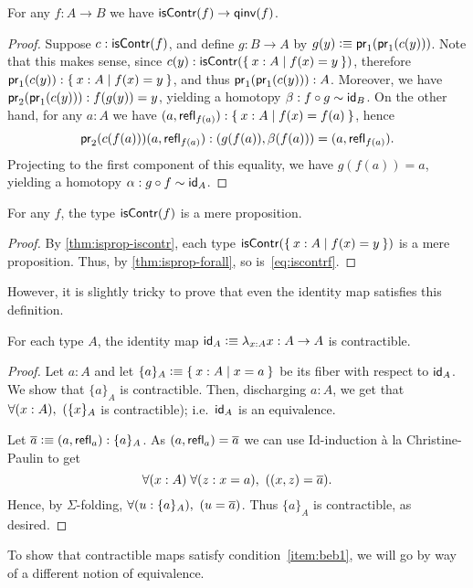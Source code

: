 \begin{lem}
  For any $f:A\to B$ we have $\iscontr(f)\to\qinv(f)$.
\end{lem}
\begin{proof}
  Suppose $c:\iscontr(f)$, and define $g:B\to A$ by $g(y)\defeq \proj1(\proj1(c(y)))$.
  Note that this makes sense, since $c(y):\iscontr (\setof{x:A | f(x) = y})$, therefore $\proj1(c(y)):\setof{x:A | f(x) = y}$, and thus $\proj1(\proj1(c(y))) : A$.
  Moreover, we have $\proj2(\proj1(c(y))) : f(g(y))=y$, yielding a homotopy $\beta:f\circ g\htpy \idfunc[B]$.
  On the other hand, for any $a:A$ we have $(a,\refl{f(a)}) : \setof{x:A | f(x) = f(a)}$, hence
  \[\proj2(c(f(a)))(a,\refl{f(a)}) : (g(f(a)),\beta(f(a))) = (a,\refl{f(a)}).\]
  Projecting to the first component of this equality, we have $g(f(a))=a$, yielding a homotopy $\alpha:g\circ f \htpy \idfunc[A]$.
\end{proof}

\begin{lem}
  For any $f$, the type $\iscontr(f)$ is a mere proposition.
\end{lem}
\begin{proof}
  By \autoref{thm:isprop-iscontr}, each type $\iscontr (\setof{x:A | f(x) = y})$ is a mere proposition.
  Thus, by \autoref{thm:isprop-forall}, so is~\eqref{eq:iscontrf}.
\end{proof}

However, it is slightly tricky to prove that even the identity map satisfies this definition.

\begin{lem}\label{lem:id-map}
For each type $A$, the identity map $\idfunc[A]\defeq \lambda_{x:A}x :A\ra A$ is contractible.
\end{lem}
\begin{proof}
  Let $a:A$ and let $\{a\}_A\defeq \setof{ x:A | x=a }$ be its fiber with respect to $\idfunc[A]$.
  We show that $\{ a\}_A$ is contractible.
  Then, discharging $a:A$, we get that $\fall{x:A} (\{ x\}_A$ is contractible); i.e.\ $\idfunc[A]$ is an equivalence.

  Let $\oa \defeq (a,\refl{a}):\{ a\}_A$.  As $(a,\refl{a}) = \oa$ we can use Id-induction \`{a} la Christine-Paulin to get
  \[\fall{x:A}{z:x=a} ((x,z)=\oa).\]
  Hence, by $\Sigma$-folding, $\fall{u:\{ a\}_A} (u=\oa)$.
  Thus $\{ a\}_A$ is contractible, as desired.
\end{proof}

To show that contractible maps satisfy condition~\ref{item:beb1}, we will go by way of a different notion of equivalence.


